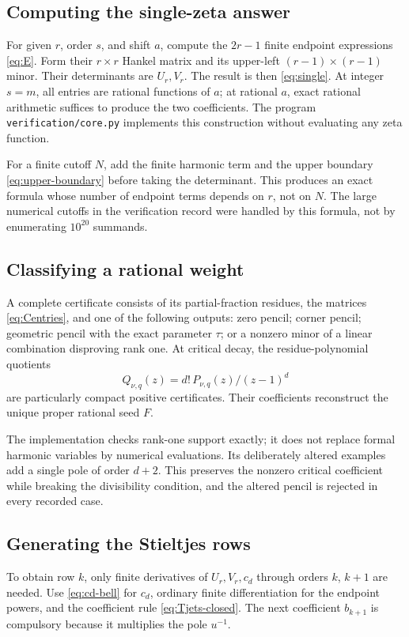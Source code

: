 \documentclass[11pt,letterpaper]{article}
\numberwithin{equation}{section}
\theoremstyle{definition}\newtheorem{definition}[theorem]{Definition}
\theoremstyle{remark}\newtheorem{remark}[theorem]{Remark}
\begin{document}
\subsection{Computing the single-zeta answer}
For given $r$, order $s$, and shift $a$, compute the $2r-1$ finite
endpoint expressions \eqref{eq:E}. Form their $r\times r$ Hankel matrix
and its upper-left $(r-1)\times(r-1)$ minor. Their determinants are
$U_r,V_r$. The result is then \eqref{eq:single}.
At integer $s=m$, all entries are rational functions of $a$; at rational
$a$, exact rational arithmetic suffices to produce the two coefficients.
The program \texttt{verification/core.py} implements this construction
without evaluating any zeta function.

For a finite cutoff $N$, add the finite harmonic term and the upper
boundary \eqref{eq:upper-boundary} before taking the determinant.
This produces an exact formula whose number of endpoint terms depends
on $r$, not on $N$. The large numerical cutoffs in the verification
record were handled by this formula, not by enumerating $10^{20}$
summands.

\subsection{Classifying a rational weight}
A complete certificate consists of its partial-fraction residues, the
matrices \eqref{eq:Centries}, and one of the following outputs:
zero pencil; corner pencil; geometric pencil with the exact parameter
$\tau$; or a nonzero minor of a linear combination disproving rank one.
At critical decay, the residue-polynomial quotients
\[
 Q_{\nu,q}(z)=d!\,P_{\nu,q}(z)/(z-1)^d
\]
are particularly compact positive certificates. Their coefficients
reconstruct the unique proper rational seed $F$.

The implementation checks rank-one support exactly; it does not replace
formal harmonic variables by numerical evaluations. Its deliberately
altered examples add a single pole of order $d+2$. This preserves the
nonzero critical coefficient while breaking the divisibility condition,
and the altered pencil is rejected in every recorded case.

\subsection{Generating the Stieltjes rows}
To obtain row $k$, only finite derivatives of $U_r,V_r,c_d$ through
orders $k$, $k+1$ are needed. Use \eqref{eq:cd-bell} for $c_d$,
ordinary finite differentiation for the endpoint powers, and the
coefficient rule \eqref{eq:Tjets-closed}. The next coefficient $b_{k+1}$
is compulsory because it multiplies the pole $u^{-1}$.
\end{document}
